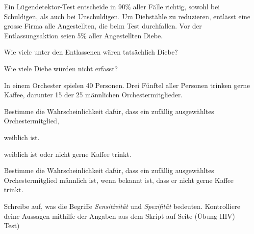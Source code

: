 \documentclass[%
11pt,%
twoside,%
titlepage,%
german,%
headsepline%
]{scrartcl}
\begin{document}
\begin{ueb}[Lügendetektortest]
Ein Lügendetektor-Test entscheide in 90\% aller Fälle richtig, sowohl bei Schuldigen, als auch bei Unschuldigen. Um Diebstähle zu reduzieren, entlässt eine grosse Firma alle Angestellten, die beim Test durchfallen. Vor der Entlassungsaktion seien 5\% aller Angestellten Diebe.
\begin{enumeratea}
\item Wie viele unter den Entlassenen wären tatsächlich Diebe?
\item Wie viele Diebe würden nicht erfasst?
\end{enumeratea}
\end{ueb}

\begin{ueb}
In einem Orchester spielen 40 Personen. Drei Fünftel aller Personen trinken gerne Kaffee, darunter 15 der 25 männlichen Orchestermitglieder.
\begin{enumeratea}
\item Bestimme die Wahrscheinlichkeit dafür, dass ein zufällig ausgewähltes Orchestermitglied,
\begin{enumeratei}
\item weiblich ist.
\item weiblich ist oder nicht gerne Kaffee trinkt.
\end{enumeratei}
\item Bestimme die Wahrscheinlichkeit dafür, dass ein zufällig ausgewähltes Orchestermitglied männlich ist,
wenn bekannt ist, dass er nicht gerne Kaffee trinkt.
\end{enumeratea}
\end{ueb}

\begin{ueb}
Schreibe auf, was die Begriffe \emph{Sensitivität} und \emph{Spezifität} bedeuten. Kontrolliere deine Aussagen mithilfe der Angaben aus dem Skript auf Seite \pageref{ueb:hiv} (\"Ubung HIV) Test)
\end{ueb}
\end{document}

